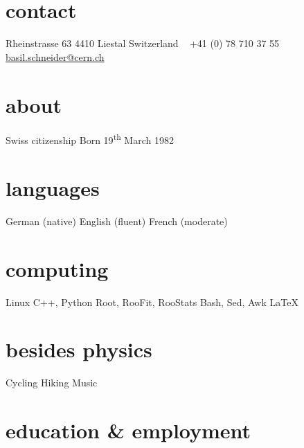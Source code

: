 \documentclass[]{cv} %
\begin{document}


\begin{aside} %
  \section{contact}
  Rheinstrasse 63
  4410 Liestal
  Switzerland
  ~
  +41 (0) 78 710 37 55
  ~
  \href{mailto:basil.schneider@cern.ch}{basil.schneider@cern.ch}
  \section{about}
  Swiss citizenship
  Born 19\textsuperscript{th} March 1982
  \section{languages}
  German (native)
  English (fluent)
  French (moderate)
  \section{computing}
  Linux
  C++, Python
  Root, RooFit, RooStats
  Bash, Sed, Awk
  \LaTeX
  \section{besides physics}
  Cycling
  Hiking
  Music
\end{aside}


\section{education \& employment}
\end{document}
